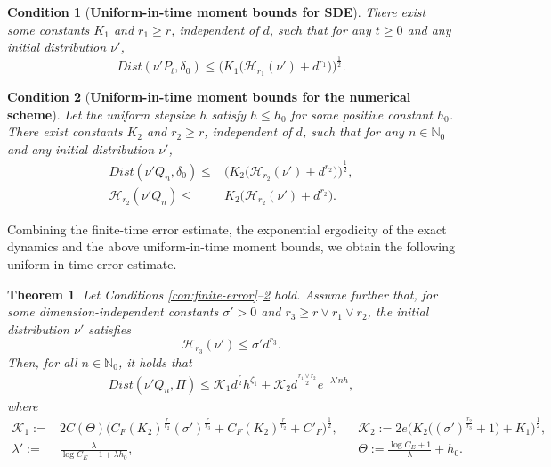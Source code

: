 \documentclass[12pt]{article}
\newenvironment{redtext}
  {\color{black}\ignorespaces}
  {\ignorespacesafterend}
\numberwithin{equation}{section}
\newtheorem{thm}{Theorem}[section]
\newtheorem{con}{Condition}[section]
\begin{document}
\begin{con}[\textbf{Uniform-in-time moment bounds for SDE}]\label{con:bound-solu}
There exist some constants $K_1$ and $r_1 \ge r $, independent of $d$, such that for any  $t\geq 0$  and  any initial distribution $\nu'$,
\begin{equation}
    \textit{Dist}
    (\nu' P_t, \delta_0) 
    \le 
    \big(
    K_1
    \big(
    \mathcal{H}_{r_1}
    (\nu')
    +
    d^{r_1}
    \big)
    \big)^{\frac{1}{2}}.
\end{equation}
\end{con}

\begin{con}[\textbf{Uniform-in-time moment bounds for the numerical scheme}]\label{con:bound-num}
Let the uniform stepsize $h$ satisfy $h \leq h_0$ for some positive constant $h_0$.
There exist constants $K_2$ and $r_2\ge r$, independent of $d$, such that  for any  $n\in \mathbb{N}_0$ and any    initial distribution $\nu'$,
\begin{redtext}
\begin{equation}
\begin{aligned}
\textit{Dist}
(\nu' Q_n, \delta_0) 
\le&
\big(
K_2
\big(
\mathcal{H}_{r_2}
(\nu')
+
d^{r_2}
\big)
\big)^{\frac{1}{2}}, \\
\mathcal{H}_{r_2}
(\nu' Q_n)
\le&
K_2
\big(\mathcal{H}_{r_2}
(\nu')
+
d^{r_2}
\big).
\end{aligned}
\end{equation}
\end{redtext}

\end{con}


Combining the finite-time error estimate, the exponential ergodicity of the exact dynamics and the above uniform-in-time moment bounds, we obtain the following uniform-in-time error estimate.


\begin{thm}\label{thm:rho-main-result}
Let Conditions \ref{con:finite-error}--\ref{con:bound-num} hold. Assume further that, for some dimension-independent constants $\sigma'>0$ and $r_3\geq r \vee r_1 \vee r_2$, 
the initial distribution $\nu'$ satisfies 
\[
\mathcal{H}_{r_3} (\nu') \leq \sigma' d^{r_3}.
\]
Then, for all $n\in\mathbb{N}_0$, it holds that
\begin{align}
\textit{Dist} (\nu' Q_n, \Pi) 
\leq 
\mathcal{K}_1 d^{\frac{r}{2}}
h^{\zeta_1} 
+ 
\mathcal{K}_2
d^{\frac{r_1\vee r_2}{2}} 
e^{-\lambda' nh}, 
\end{align}
where 
\begin{align}
\mathcal{K}_1
:=  &
2
C(\Theta)
\big(
C_F(K_2)^{\frac{r}{r_2}} 
(\sigma')^{\frac{r}{r_3}}
+
C_F(K_2)^{\frac{r}{r_2}}+C'_{F}
\big)^{\frac{1}{2}}
,  
& &
\mathcal{K}_2
:=  
2e
\Big(
K_2\big(
(\sigma')^{\frac{r_2}{r_3}}
+1\big)
+K_1
\Big)
^{\frac{1}{2}}
,
\\ 
\lambda'
:=  &
\tfrac{ \lambda }{\log C_E+1+\lambda h_0}
,
& &
\Theta
  :=     
\tfrac{\log C_E + 1}{\lambda}
+
h_0.
\end{align}
\end{thm}
\end{document}
